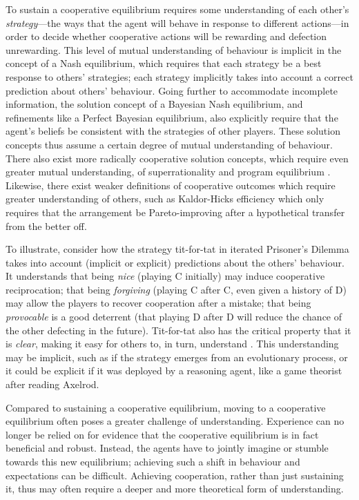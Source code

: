 \documentclass[11pt, a4paper, logo, onecolumn, nonumbering]{deepmind}
\begin{document}
To sustain a cooperative equilibrium requires some understanding of each other's \textit{strategy}---the ways that the agent will behave in response to different actions---in order to decide whether cooperative actions will be rewarding and defection unrewarding. 
This level of mutual understanding of behaviour is implicit in the concept of a Nash equilibrium, which requires that each strategy be a best response to others' strategies; each strategy implicitly takes into account a correct prediction about others' behaviour. Going further to accommodate incomplete information, the solution concept of a Bayesian Nash equilibrium, and refinements like a Perfect Bayesian equilibrium, also explicitly require that the agent's beliefs be consistent with the strategies of other players. These solution concepts thus assume a certain degree of mutual understanding of behaviour. There also exist more radically cooperative solution concepts, which require even greater mutual understanding, of superrationality \cite{hofstadter2008metamagical, fourny2015perfect} and program equilibrium \cite{tennenholtz2004program, barasz2014robust, critch2019parametric, gentry2009fully}. Likewise, there exist weaker definitions of cooperative outcomes which require greater understanding of others, such as Kaldor-Hicks efficiency \cite{10.2307/2225023, 10.2307/2224835} which only requires that the arrangement be Pareto-improving after a hypothetical transfer from the better off. %


To illustrate, consider how the strategy tit-for-tat in iterated Prisoner's Dilemma takes into account (implicit or explicit) predictions about the others' behaviour. It understands that being \textit{nice} (playing C initially) may induce cooperative reciprocation; that being \textit{forgiving} (playing C after C, even given a history of D) may allow the players to recover cooperation after a mistake; that being \textit{provocable} is a good deterrent (that playing D after D will reduce the chance of the other defecting in the future). Tit-for-tat also has the critical property that it is \textit{clear}, making it easy for others to, in turn, understand \cite[54]{axelrod1984evolution}. This understanding may be implicit, such as if the strategy emerges from an evolutionary process, or it could be explicit if it was deployed by a reasoning agent, like a game theorist after reading Axelrod.


Compared to sustaining a cooperative equilibrium, moving to a cooperative equilibrium often poses a greater challenge of understanding. Experience can no longer be relied on for evidence that the cooperative equilibrium is in fact beneficial and robust. Instead, the agents have to jointly imagine or stumble towards this new equilibrium; achieving such a shift in behaviour and expectations can be difficult. Achieving cooperation, rather than just sustaining it, thus may often require a deeper and more theoretical form of understanding.%
\end{document}
